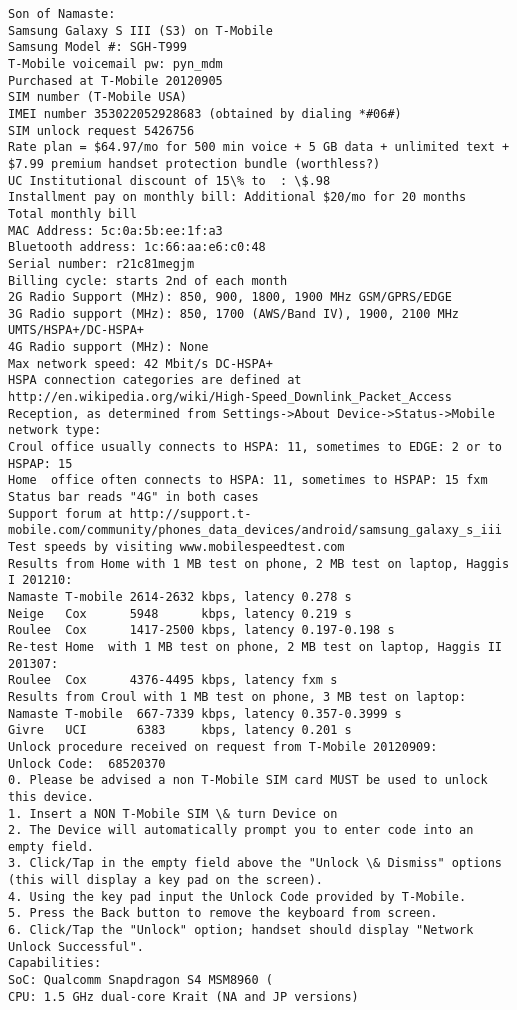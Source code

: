 \documentclass[12pt,twoside]{article}
\begin{document}
\begin{verbatim}
Son of Namaste:
Samsung Galaxy S III (S3) on T-Mobile
Samsung Model #: SGH-T999
T-Mobile voicemail pw: pyn_mdm
Purchased at T-Mobile 20120905
SIM number (T-Mobile USA) 
IMEI number 353022052928683 (obtained by dialing *#06#)
SIM unlock request 5426756
Rate plan = $64.97/mo for 500 min voice + 5 GB data + unlimited text + $7.99 premium handset protection bundle (worthless?)
UC Institutional discount of 15\% to  : \$.98
Installment pay on monthly bill: Additional $20/mo for 20 months
Total monthly bill 
MAC Address: 5c:0a:5b:ee:1f:a3
Bluetooth address: 1c:66:aa:e6:c0:48
Serial number: r21c81megjm
Billing cycle: starts 2nd of each month
2G Radio Support (MHz): 850, 900, 1800, 1900 MHz GSM/GPRS/EDGE
3G Radio support (MHz): 850, 1700 (AWS/Band IV), 1900, 2100 MHz UMTS/HSPA+/DC-HSPA+
4G Radio support (MHz): None
Max network speed: 42 Mbit/s DC-HSPA+
HSPA connection categories are defined at
http://en.wikipedia.org/wiki/High-Speed_Downlink_Packet_Access
Reception, as determined from Settings->About Device->Status->Mobile network type: 
Croul office usually connects to HSPA: 11, sometimes to EDGE: 2 or to HSPAP: 15
Home  office often connects to HSPA: 11, sometimes to HSPAP: 15 fxm
Status bar reads "4G" in both cases
Support forum at http://support.t-mobile.com/community/phones_data_devices/android/samsung_galaxy_s_iii
Test speeds by visiting www.mobilespeedtest.com
Results from Home with 1 MB test on phone, 2 MB test on laptop, Haggis I 201210:
Namaste T-mobile 2614-2632 kbps, latency 0.278 s
Neige   Cox      5948      kbps, latency 0.219 s
Roulee  Cox      1417-2500 kbps, latency 0.197-0.198 s
Re-test Home  with 1 MB test on phone, 2 MB test on laptop, Haggis II 201307:
Roulee  Cox      4376-4495 kbps, latency fxm s
Results from Croul with 1 MB test on phone, 3 MB test on laptop:
Namaste T-mobile  667-7339 kbps, latency 0.357-0.3999 s
Givre   UCI       6383     kbps, latency 0.201 s
Unlock procedure received on request from T-Mobile 20120909:
Unlock Code:  68520370
0. Please be advised a non T-Mobile SIM card MUST be used to unlock this device.
1. Insert a NON T-Mobile SIM \& turn Device on
2. The Device will automatically prompt you to enter code into an empty field.
3. Click/Tap in the empty field above the "Unlock \& Dismiss" options (this will display a key pad on the screen).
4. Using the key pad input the Unlock Code provided by T-Mobile.
5. Press the Back button to remove the keyboard from screen.
6. Click/Tap the "Unlock" option; handset should display "Network Unlock Successful".
Capabilities:
SoC: Qualcomm Snapdragon S4 MSM8960 (
CPU: 1.5 GHz dual-core Krait (NA and JP versions)

\end{verbatim}
\end{document}
